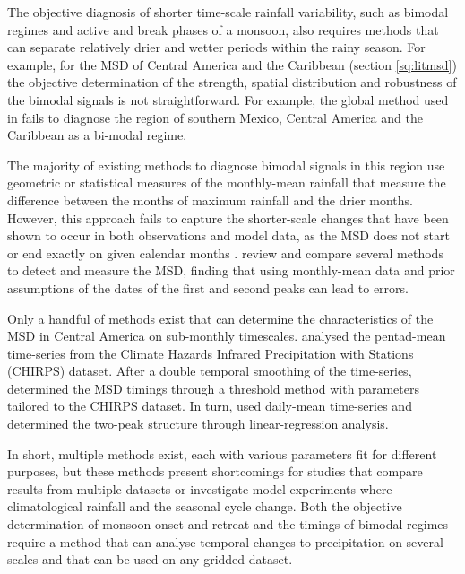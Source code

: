 The objective diagnosis of shorter time-scale rainfall variability, such as bimodal regimes and active and break phases of a monsoon, also requires methods that can separate relatively drier and wetter periods within the rainy season. For example, for the MSD of Central America and the Caribbean (section \ref{sq:litmsd}) the objective determination of the strength, spatial distribution and robustness of the bimodal signals is not straightforward. For example, the global method used in \cite{bombardi2019} fails to diagnose the region of southern Mexico, Central America and the Caribbean as a bi-modal regime. 

The majority of existing methods to diagnose bimodal signals in this region use geometric or statistical measures of the monthly-mean rainfall that measure the difference between the months of maximum rainfall and the drier months.  
However, this approach fails to capture the shorter-scale changes that have been shown to occur in both observations and model data, as the MSD does not start or end exactly on given calendar months \citep{magana1999,garciafranco2020}.  \cite{zhao2021} review and compare several methods to detect and measure the MSD, finding that using monthly-mean data and prior assumptions of the dates of the first and second peaks can lead to errors.  %

Only a handful of methods exist that can determine the characteristics of the MSD in Central America on sub-monthly timescales. \cite{anderson2019multiscale} analysed the pentad-mean time-series from the   Climate Hazards Infrared Precipitation with Stations (CHIRPS) dataset. After a double temporal smoothing of the time-series, \cite{anderson2019multiscale} determined the MSD timings through a threshold method with parameters tailored to the CHIRPS dataset.
In turn, \cite{zhao2020} used daily-mean time-series and determined the two-peak structure through linear-regression analysis.

In short, multiple methods exist, each with various parameters fit for different purposes, but these methods present shortcomings for studies that compare results from multiple datasets or investigate model experiments where climatological rainfall and the seasonal cycle change.
Both the objective determination of monsoon onset and retreat and the timings of bimodal regimes require a method that can analyse temporal changes to precipitation on several scales and that can be used on any gridded dataset. 




